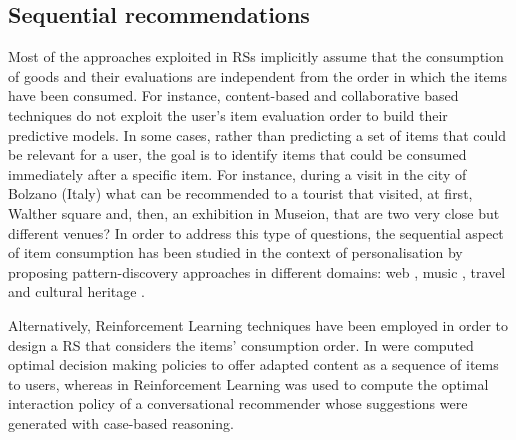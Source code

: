\subsection{Sequential recommendations}
\label{sec:sequentialrecommendation}
Most of the approaches exploited in RSs implicitly assume that the consumption of 
goods and their evaluations are independent from the order in which the items have been consumed.
For instance, content-based and collaborative based techniques do not exploit the user's item evaluation order to build their predictive models.
In some cases, rather than predicting a set of items that could be relevant for a user, the goal is to identify items that could be consumed immediately after a specific item. For instance, during a visit in the city of Bolzano (Italy) what can be recommended to a tourist that visited, at first, Walther square and, then, an exhibition in Museion, that are two very close but different venues?
In order to address this type of questions, the sequential aspect of item consumption 
has been studied in the context of personalisation by proposing pattern-discovery approaches in different domains: web \cite{mobasher:2002}, music \cite{hariri2012, jannach2017}, travel \cite{zhang:seq:travel:2014,flikr_tourism_RS:muntean:2015,palumbo:2017} and cultural heritage \cite{hashemi:2017}. 

Alternatively, Reinforcement Learning techniques have been employed in order to design a RS that considers the items' consumption order. In \cite{shani:RS:MDP:2005,moling:rl:seq} were computed optimal decision making policies to offer adapted content as a sequence of items to users, whereas in \cite{mahmood:seq:rl:2009} Reinforcement Learning was used to compute the optimal interaction policy of a conversational recommender whose suggestions were generated with case-based reasoning.

